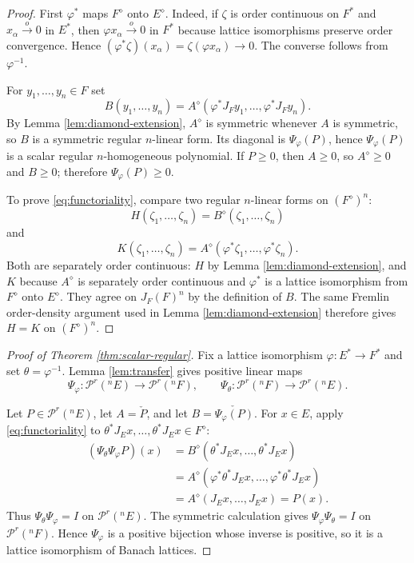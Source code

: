 \documentclass[11pt]{amsart}
\newcommand{\Prg}{\mathcal P^r}
\begin{document}
\begin{proof}
First $\varphi^*$ maps $F^\diamond$ onto $E^\diamond$.  Indeed, if $\zeta$ is
order continuous on $F^*$ and $x_\alpha\stackrel{o}{\to}0$ in $E^*$, then
$\varphi x_\alpha\stackrel{o}{\to}0$ in $F^*$ because lattice isomorphisms
preserve order convergence.  Hence
$(\varphi^*\zeta)(x_\alpha)=\zeta(\varphi x_\alpha)\to0$.  The converse follows
from $\varphi^{-1}$.

For $y_1,\ldots,y_n\in F$ set
\[
        B(y_1,\ldots,y_n)
        =
        A^\diamond(\varphi^*J_Fy_1,\ldots,\varphi^*J_Fy_n).
\]
By Lemma \ref{lem:diamond-extension}, $A^\diamond$ is symmetric whenever $A$ is
symmetric, so $B$ is a symmetric regular $n$-linear form.  Its diagonal is
$\Psi_\varphi(P)$, hence $\Psi_\varphi(P)$ is a scalar regular
$n$-homogeneous polynomial.  If $P\geq0$, then $A\geq0$, so
$A^\diamond\geq0$ and $B\geq0$; therefore $\Psi_\varphi(P)\geq0$.

To prove \eqref{eq:functoriality}, compare two regular $n$-linear forms on
$(F^\diamond)^n$:
\[
        H(\zeta_1,\ldots,\zeta_n)
        =B^\diamond(\zeta_1,\ldots,\zeta_n)
\]
and
\[
        K(\zeta_1,\ldots,\zeta_n)
        =A^\diamond(\varphi^*\zeta_1,\ldots,\varphi^*\zeta_n).
\]
Both are separately order continuous: $H$ by Lemma
\ref{lem:diamond-extension}, and $K$ because $A^\diamond$ is separately order
continuous and $\varphi^*$ is a lattice isomorphism from $F^\diamond$ onto
$E^\diamond$.  They agree on $J_F(F)^n$ by the definition of $B$.  The same
Fremlin order-density argument used in Lemma \ref{lem:diamond-extension}
therefore gives $H=K$ on $(F^\diamond)^n$.
\end{proof}

\begin{proof}[Proof of Theorem \ref{thm:scalar-regular}]
Fix a lattice isomorphism $\varphi:E^*\to F^*$ and set
$\theta=\varphi^{-1}$.  Lemma \ref{lem:transfer} gives positive linear maps
\[
        \Psi_\varphi:\Prg({}^nE)\to\Prg({}^nF),
        \qquad
        \Psi_\theta:\Prg({}^nF)\to\Prg({}^nE).
\]

Let $P\in\Prg({}^nE)$, let $A=\check P$, and let
$B=\check{\Psi_\varphi(P)}$.  For $x\in E$, apply
\eqref{eq:functoriality} to
$\theta^*J_Ex,\ldots,\theta^*J_Ex\in F^\diamond$:
\[
\begin{aligned}
(\Psi_\theta\Psi_\varphi P)(x)
 &= B^\diamond(\theta^*J_Ex,\ldots,\theta^*J_Ex)\\
 &= A^\diamond(\varphi^*\theta^*J_Ex,\ldots,\varphi^*\theta^*J_Ex)\\
 &= A^\diamond(J_Ex,\ldots,J_Ex)
  = P(x).
\end{aligned}
\]
Thus $\Psi_\theta\Psi_\varphi=I$ on $\Prg({}^nE)$.  The symmetric calculation
gives $\Psi_\varphi\Psi_\theta=I$ on $\Prg({}^nF)$.  Hence $\Psi_\varphi$ is a
positive bijection whose inverse is positive, so it is a lattice isomorphism
of Banach lattices.
\end{proof}
\end{document}
